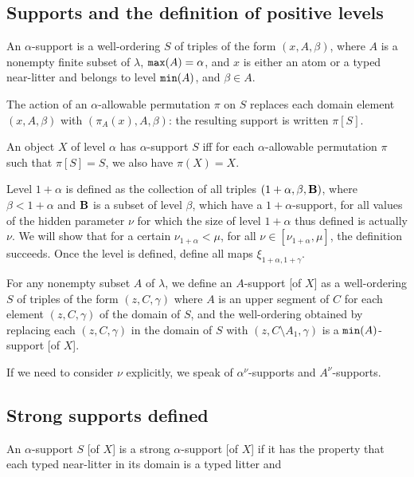 \documentclass[12pt]{article}
\begin{document}
\subsection{Supports and the definition of positive levels}

An $\alpha$-support is a well-ordering $S$ of triples of the form $(x,A,\beta)$, where $A$ is a nonempty finite subset of $\lambda$,  ${\tt max}(A)=\alpha$, and $x$ is either an atom or a typed near-litter and belongs to level ${\tt min}(A)$, and $\beta\in A$.

The action of an $\alpha$-allowable permutation $\pi$ on $S$ replaces each domain element  $(x,A,\beta)$ with $(\pi_A(x),A,\beta)$:  the resulting support is written $\pi[S]$.

An object $X$ of level $\alpha$ has $\alpha$-support $S$ iff for each $\alpha$-allowable permutation $\pi$ such that $\pi[S]=S$, we also have $\pi(X)=X$.

Level $1+\alpha$ is defined as the collection of all triples $(1+\alpha,\beta,{\bf B})$, where $\beta<1+\alpha$ and ${\bf B}$ is a subset of level $\beta$, which have a $1+\alpha$-support, for all values of the hidden
parameter $\nu$ for which the size of level $1+\alpha$ thus defined is actually $\nu$.  We will show that for a certain $\nu_{1+\alpha}<\mu$, for all $\nu \in [\nu_{1+\alpha},\mu]$, the definition succeeds.  Once the level is defined, define all maps $\xi_{1+\alpha,1+\gamma}$.

For any nonempty subset $A$ of $\lambda$, we define an $A$-support [of $X$] as a well-ordering $S$ of triples of the form $(z,C,\gamma)$  where $A$ is an upper segment of $C$ for each element $(z,C,\gamma)$ of the domain of $S$, and the
well-ordering obtained by replacing each $(z,C,\gamma)$ in the domain of $S$ with $(z,C \setminus A_1,\gamma)$ is
a ${\tt min}(A)$-support [of $X$].

If we need to consider $\nu$ explicitly, we speak of $\alpha^\nu$-supports and $A^\nu$-supports.

\subsection{Strong supports defined}

An $\alpha$-support $S$ [of $X$] is a strong $\alpha$-support [of $X$] if it has the property that each typed near-litter in its domain is a typed litter and
\end{document}
